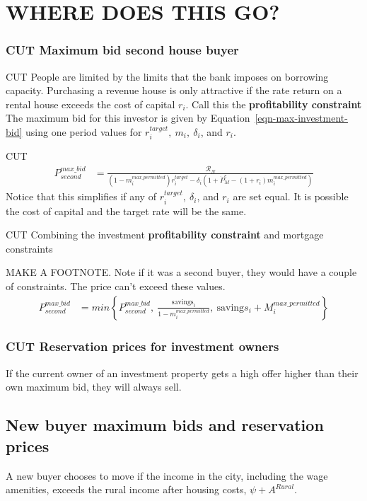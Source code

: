 {\color{orange}
\section{WHERE DOES THIS GO?}


\subsubsection{CUT Maximum bid second house buyer}

CUT People are limited by the limits  that the bank imposes on borrowing capacity. Purchasing a revenue house is only attractive if the rate return on a rental house exceeds the cost of capital $r_i$. Call this the \textbf{profitability constraint} The maximum bid for this investor is given by Equation~\ref{eqn-max-investment-bid} using one period values for $r_i^{target},\ m_i,\ \delta_i$, and $r_i$.

CUT \begin{eqnarray}\label{eqn-max-second-bid}
P_{second}^{max\_bid} & = \frac{\mathcal{R}_N}{(1-m_i^{max\_permitted})r_i^{target}-\delta_i \left(1 + \dot P_M^e - (1+r_i)m_i^{max\_permitted}\right)} 
\end{eqnarray}
Notice that this simplifies if any of $r_i^{target},\ \delta_i$, and $r_i$ are set equal. It is possible the cost of capital and the target rate will be the same.

CUT Combining the investment \textbf{profitability constraint} and mortgage constraints


MAKE A FOOTNOTE. Note if it was a second buyer, they would have a couple of constraints. The price can't exceed these values.
\begin{eqnarray}
P_{second}^{max\_bid} & = min \left\{P_{second}^{max\_bid},\ \frac{\mathrm{savings}_i}{1-m_i^{max\_permitted}},\ \mathrm{saving}s_i + M_i^{max\_permitted}  \right\}  \nonumber
\end{eqnarray}

\subsubsection{CUT Reservation prices for investment owners}
If the current owner of an investment  property gets a high offer higher than their own maximum bid, they will always sell.  


\subsection{New buyer maximum bids and reservation prices }
A new buyer chooses to move if the income in the city, including the wage amenities, exceeds the rural income after housing costs, $\psi+A^{Rural}$. 

}
